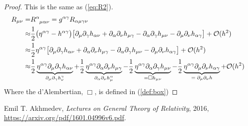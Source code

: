 \documentclass[]{article}
\begin{document}
\begin{proof}
	This is the same as (\ref{eq:R2}).
	\begin{align*}
	R_{\mu\nu} =& R\indices{^\alpha_{\mu\alpha\nu}} = g^{\alpha\gamma}R_{\alpha\mu\gamma\nu}\\
	\approx&\frac{1}{2} \big(\eta^{\alpha\gamma}- h^{\alpha\gamma}\big) \big[\partial_{\mu}\partial_{\gamma}h_{\alpha\nu} + \partial_{\alpha}\partial_{\nu}h_{\mu\gamma} - \partial_{\alpha}\partial_{\gamma}h_{\mu\nu} - \partial_{\mu}\partial_{\nu}h_{\alpha\gamma}\big]+ \mathcal{O}(h^2)\\
	\approx&\frac{1}{2} \eta^{\alpha\gamma} \big[\partial_{\mu}\partial_{\gamma}h_{\alpha\nu} + \partial_{\alpha}\partial_{\nu}h_{\mu\gamma} - \partial_{\alpha}\partial_{\gamma}h_{\mu\nu} - \partial_{\mu}\partial_{\nu}h_{\alpha\gamma}\big]+ \mathcal{O}(h^2)\\
	\approx& \frac{1}{2} \underbrace{\eta^{\alpha\gamma}\partial_{\mu}\partial_{\gamma}h_{\alpha\nu}}_\text{$\partial_{\mu}\partial_{\gamma}h^{\gamma}_{\nu}$} + \frac{1}{2} \underbrace{\eta^{\alpha\gamma}\partial_{\alpha}\partial_{\nu}h_{\mu\gamma}}_\text{$\partial_{\alpha}\partial_{\nu}h^{\alpha}_{\mu}$}- \frac{1}{2}  \underbrace{\eta^{\alpha\gamma}\partial_{\alpha}\partial_{\gamma}h_{\mu\nu}}_{=\Box h_{\mu\nu}} - \frac{1}{2} \underbrace{\eta^{\alpha\gamma}\partial_{\mu}\partial_{\nu}h_{\alpha\gamma}}_\text{$=\partial_{\mu}\partial_{\nu}h$}+ \mathcal{O}(h^2)
	\end{align*}
	Where the d'Alembertian, $\Box$, is defined in (\ref{def:box})	
\end{proof}

\begin{thebibliography}{9}
	
	Emil T. Akhmedev,
	\emph{Lectures on General Theory of Relativity},
	2016,
	\url{https://arxiv.org/pdf/1601.04996v6.pdf}.
	
	
\end{thebibliography}
\end{document}

